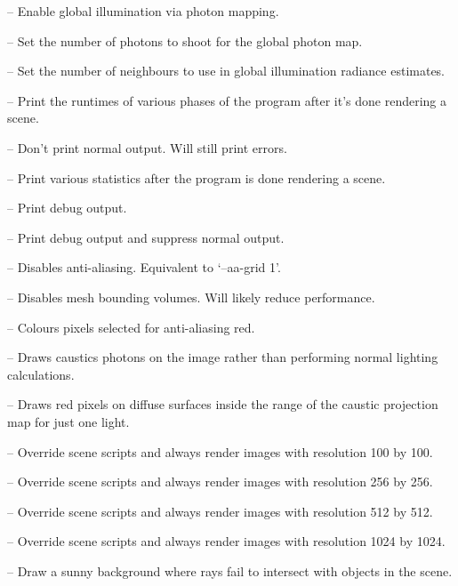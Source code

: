 \documentclass{article}
\begin{document}
\begin{itemize}
   -- Enable global illumination via photon mapping.

   -- Set the number of photons to shoot for the global photon map.

   -- Set the number of neighbours to use in global illumination radiance estimates.

   -- Print the runtimes of various phases of the program
  after it's done rendering a scene.

   -- Don't print normal output. Will still print errors.

   -- Print various statistics after the program is done
  rendering a scene.

   -- Print debug output.

   -- Print debug output and suppress normal output.

   -- Disables anti-aliasing. Equivalent to `--aa-grid 1'.

   -- Disables mesh bounding volumes. Will likely reduce
  performance.

   -- Colours pixels selected for anti-aliasing red.

   -- Draws caustics photons on the image rather
  than performing normal lighting calculations.

   -- Draws red pixels on diffuse surfaces inside
  the range of the caustic projection map for just one light.

   -- Override scene scripts and always render images with
  resolution 100 by 100.

   -- Override scene scripts and always render images with
  resolution 256 by 256.

   -- Override scene scripts and always render images with
  resolution 512 by 512.

   -- Override scene scripts and always render images with
  resolution 1024 by 1024.

   -- Draw a sunny background where rays fail to intersect with
  objects in the scene.

\end{itemize}
\end{document}
